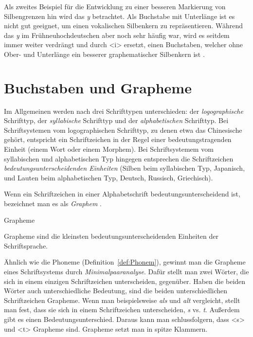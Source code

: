 Als zweites Beispiel für die Entwicklung zu einer besseren Markierung von Silbengrenzen hin wird das \textit{y} betrachtet. Als Buchstabe mit Unterlänge ist es nicht gut geeignet, um einen vokalischen Silbenkern zu repräsentieren. Während das \textit{y} im Frühneuhochdeutschen aber noch sehr häufig war, wird es seitdem immer weiter verdrängt und durch <i> ersetzt, einen Buchstaben, welcher ohne Ober- und Unterlänge ein besserer graphematischer Silbenkern ist \citep[220--221]{FuhrhopPeters2013}.



\section{Buchstaben und Grapheme}\label{sec:BuchstabenGrapheme}

 Im Allgemeinen werden nach \citet[69--70]{Duerscheid2016} drei Schrifttypen unterschieden: der \textit{logographische} Schrifttyp, der \textit{syllabische} Schrifttyp und der \textit{alphabetischen} Schrifttyp. Bei Schriftsystemen vom logographischen Schrifttyp, zu denen etwa das Chinesische gehört, entspricht ein Schriftzeichen in der Regel einer bedeutungstragenden Einheit (\zB einem Wort oder einem Morphem). Bei Schriftsystemem vom syllabischen und alphabetischen Typ hingegen entsprechen die Schriftzeichen \textit{bedeutungsunterscheidenden Einheiten} (Silben beim syllabischen Typ, \zB Japanisch, und Lauten beim alphabetischen Typ, \zB Deutsch, Russisch, Griechisch).

Wenn ein Schriftzeichen in einer Alphabetschrift bedeutungsunterscheidend ist, bezeichnet man es als \textit{Graphem} \citep[202]{FuhrhopPeters2013}.

\begin{Definition}{Grapheme}\label{def:Grapheme}
    
\noindent Grapheme sind die kleinsten bedeutungsunterscheidenden Einheiten der Schriftsprache.
\end{Definition}



Ähnlich wie die Phoneme (Definition~\ref{def:Phonem}), gewinnt man die Grapheme eines Schriftsystems durch \textit{Minimalpaaranalyse}. Dafür stellt man zwei Wörter, die sich in einem einzigen Schriftzeichen unterscheiden, gegenüber. Haben die beiden Wörter auch unterschiedliche Bedeutung, sind die beiden unterschiedlichen Schriftzeichen Grapheme. Wenn man beispielsweise \textit{als} und \textit{alt} vergleicht, stellt man fest, dass sie sich in einem Schriftzeichen unterscheiden, \textit{s} vs. \textit{t}. Außerdem gibt es einen Bedeutungsunterschied. Daraus kann man schlussfolgern, dass <s> und <t> Grapheme sind. Grapheme setzt man in spitze Klammern. 

